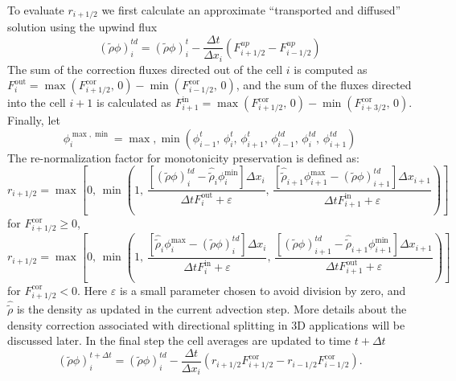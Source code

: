   To evaluate $r_{i+1/2}$ we first calculate an approximate
  ``transported and diffused'' solution using the upwind flux
  \begin{equation}
    (\tilde{\rho} \phi)^{td}_{i} = (\tilde{\rho} \phi)^{t}_{i} - \frac{\Delta t}{\Delta
      x_{i}} \left (F^{up}_{i+1/2} - F^{up}_{i-1/2} \right )
  \end{equation}
  The sum of the correction fluxes directed out of the cell $i$ is
  computed as $F^{\mathrm{out}}_{i} = \max(F^{\mathrm{cor}}_{i+1/2},\, 0) -
  \min(F^{\mathrm{cor}}_{i-1/2},\, 0)$, and the sum of the fluxes
  directed into the cell $i+1$ is calculated as $F^{\mathrm{in}}_{i+1} =
  \max(F^{\mathrm{cor}}_{i+1/2},\, 0) - \min(F^{\mathrm{cor}}_{i+3/2},\,
  0)$. Finally, let
  \begin{equation}
    \phi^{\max,\min}_{i} = \max, \min(\phi^{t}_{i-1}, \, \phi^{t}_{i},
    \, \phi^{t}_{i+1}, \, \phi^{td}_{i-1}, \, \phi^{td}_{i},
    \, \phi^{td}_{i+1})
  \end{equation}
  The re-normalization factor for monotonicity preservation is defined
  as:
  \begin{equation}
    r_{i+1/2} = \max \left [0, \, \min \left(1, \, \frac{[(\tilde{\rho}
          \phi)_{i}^{td} - \hat{\tilde{\rho}}_{i}\phi_{i}^{\min} ]
          \Delta x_{i}}{\Delta t F^{\mathrm{out}}_{i} + \varepsilon}, \,
        \frac{[\hat{\tilde{\rho}}_{i+1} \phi^{\max}_{i+1} - (\tilde{\rho}
          \phi)_{i+1}^{td}] \Delta x_{i+1}}{\Delta t
          F^{\mathrm{in}}_{i+1} + \varepsilon} \right ) \right ]
  \end{equation}
  for $F^{\mathrm{cor}}_{i+1/2} \ge 0$,
  \begin{equation}
    r_{i+1/2} = \max \left [0, \, \min \left(1, \, \frac{[\hat{\tilde{\rho}}_{i}
          \phi^{\max}_{i} - (\tilde{\rho} \phi)_{i}^{td}] \Delta x_{i}}{\Delta t
          F^{\mathrm{in}}_{i} + \varepsilon}, \, \frac{[(\tilde{\rho}
          \phi)_{i+1}^{td} - \hat{\tilde{\rho}}_{i+1}\phi_{i+1}^{\min}
          ] \Delta x_{i+1}}{\Delta t F^{\mathrm{out}}_{i+1} +
          \varepsilon}  \right ) \right ]
  \end{equation}
  for $F^{\mathrm{cor}}_{i+1/2} < 0$. Here $\varepsilon$ is a small
  parameter chosen to avoid division by zero, and $\hat{\tilde{\rho}}$ is the
  density as updated in the current advection step. More details about
  the density correction associated with directional splitting in 3D
  applications will be discussed later. In the final step the cell
  averages are updated to time $t+\Delta t$
  \begin{equation}
    (\tilde{\rho} \phi)^{t+\Delta t}_{i} = (\tilde{\rho} \phi)^{td}_{i} -
    \frac{\Delta t}{\Delta x_{i}} \left
      (r_{i+1/2}F^{\mathrm{cor}}_{i+1/2} -
      r_{i-1/2}F^{\mathrm{cor}}_{i-1/2} \right ).
  \end{equation}

